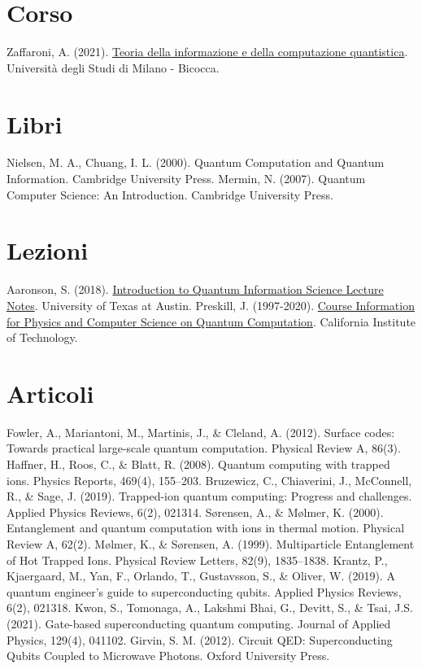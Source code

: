 \begin{thebibliography}{12}
\section*{Corso}
Zaffaroni, A. (2021). \href{https://elearning.unimib.it/course/view.php?id=39146}{Teoria della informazione e della computazione quantistica}. Università degli Studi di Milano - Bicocca.
\section*{Libri}
Nielsen, M. A., Chuang, I. L. (2000). Quantum Computation and Quantum Information. Cambridge University Press.
Mermin, N. (2007). Quantum Computer Science: An Introduction. Cambridge University Press.
\section*{Lezioni}
Aaronson, S. (2018). \href{https://www.scottaaronson.com/qclec.pdf}{Introduction to Quantum Information Science Lecture Notes}. University of Texas at Austin.
Preskill, J. (1997-2020). \href{http://theory.caltech.edu/~preskill/ph219/}{Course Information for Physics and Computer Science on Quantum Computation}. California Institute of Technology.
\section*{Articoli}
Fowler, A., Mariantoni, M., Martinis, J., \& Cleland, A. (2012). Surface codes: Towards practical large-scale quantum computation. Physical Review A, 86(3).
Haffner, H., Roos, C., \& Blatt, R. (2008). Quantum computing with trapped ions. Physics Reports, 469(4), 155–203.
Bruzewicz, C., Chiaverini, J., McConnell, R., \& Sage, J. (2019). Trapped-ion quantum computing: Progress and challenges. Applied Physics Reviews, 6(2), 021314.
Sørensen, A., \& Mølmer, K. (2000). Entanglement and quantum computation with ions in thermal motion. Physical Review A, 62(2).
Mølmer, K., \& Sørensen, A. (1999). Multiparticle Entanglement of Hot Trapped Ions. Physical Review Letters, 82(9), 1835–1838.
Krantz, P., Kjaergaard, M., Yan, F., Orlando, T., Gustavsson, S., \& Oliver, W. (2019). A quantum engineer’s guide to superconducting qubits. Applied Physics Reviews, 6(2), 021318.
Kwon, S., Tomonaga, A., Lakshmi Bhai, G., Devitt, S., \& Tsai, J.S. (2021). Gate-based superconducting quantum computing. Journal of Applied Physics, 129(4), 041102.
Girvin, S. M. (2012). Circuit QED: Superconducting Qubits Coupled to Microwave Photons. Oxford University Press.
\end{thebibliography}